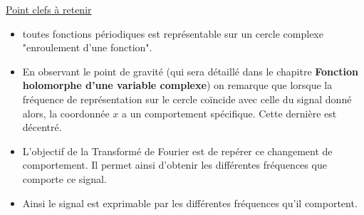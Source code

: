 \documentclass[a4paper]{book}
\begin{document}
\underline{Point clefs à retenir}
\begin{itemize}
	\item toutes fonctions périodiques est représentable sur un cercle
		complexe "enroulement d'une fonction". 
	\item En observant le point de gravité (qui sera détaillé dans le
		chapitre \textbf{Fonction holomorphe d'une variable complexe})
		on remarque que lorsque la fréquence
		de représentation sur le cercle coïncide avec celle du signal
		donné alors, la coordonnée $x$ a un comportement spécifique.
		Cette dernière est décentré.
	\item L'objectif de la Transformé de Fourier est de repérer ce
		changement de comportement. Il permet ainsi d'obtenir les
		différentes fréquences que comporte ce signal.
	\item Ainsi le signal est exprimable par les différentes fréquences qu'il
		comportent.
\end{itemize}
\end{document}
